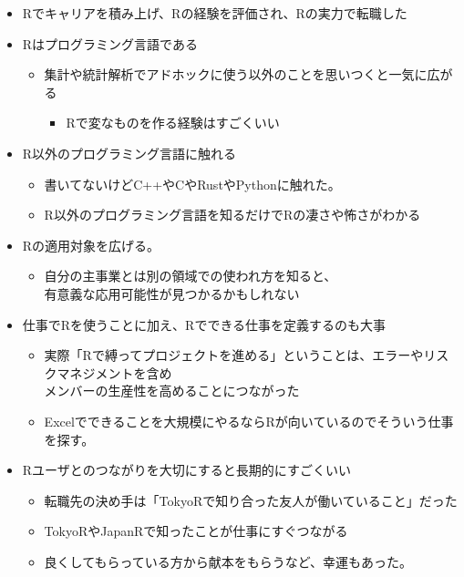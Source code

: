 \documentclass[
  letterpaper,
  DIV=11,
  numbers=noendperiod]{scrartcl}
\providecommand{\tightlist}{%
  \setlength{\itemsep}{0pt}\setlength{\parskip}{0pt}}\usepackage{longtable,booktabs,array}
\begin{document}
\begin{itemize}
\tightlist
\item
  Rでキャリアを積み上げ、Rの経験を評価され、Rの実力で転職した
\item
  Rはプログラミング言語である

  \begin{itemize}
  \tightlist
  \item
    集計や統計解析でアドホックに使う以外のことを思いつくと一気に広がる

    \begin{itemize}
    \tightlist
    \item
      Rで変なものを作る経験はすごくいい
    \end{itemize}
  \end{itemize}
\item
  R以外のプログラミング言語に触れる

  \begin{itemize}
  \tightlist
  \item
    書いてないけどC++やCやRustやPythonに触れた。
  \item
    R以外のプログラミング言語を知るだけでRの凄さや怖さがわかる
  \end{itemize}
\item
  Rの適用対象を広げる。

  \begin{itemize}
  \tightlist
  \item
    自分の主事業とは別の領域での使われ方を知ると、\\
    有意義な応用可能性が見つかるかもしれない
  \end{itemize}
\item
  仕事でRを使うことに加え、Rでできる仕事を定義するのも大事

  \begin{itemize}
  \tightlist
  \item
    実際「Rで縛ってプロジェクトを進める」ということは、エラーやリスクマネジメントを含め\\
    メンバーの生産性を高めることにつながった
  \item
    Excelでできることを大規模にやるならRが向いているのでそういう仕事を探す。
  \end{itemize}
\item
  Rユーザとのつながりを大切にすると長期的にすごくいい

  \begin{itemize}
  \tightlist
  \item
    転職先の決め手は「TokyoRで知り合った友人が働いていること」だった
  \item
    TokyoRやJapanRで知ったことが仕事にすぐつながる
  \item
    良くしてもらっている方から献本をもらうなど、幸運もあった。
  \end{itemize}
\end{itemize}
\end{document}
